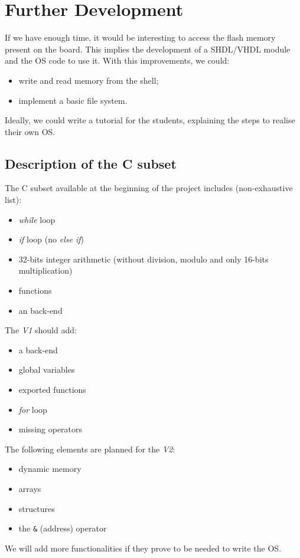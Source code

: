\documentclass{article}
\begin{document}
    \section{Further Development}
      If we have enough time, it would be interesting to access the flash memory
      present on the board. This implies the development of a SHDL/VHDL module
      and the OS code to use it. With this improvements, we could:
      \begin{itemize}
        \item write and read memory from the shell;
        \item implement a basic file system.
      \end{itemize}
      Ideally, we could write a tutorial for the students, explaining the steps
      to realise their own OS.

  \newpage

  \begin{appendix}
    \section{Description of the C subset}\label{app:C89}
      The C subset available at the beginning of the project includes
      (non-exhaustive list):
      \begin{itemize}
        \item \textit{while} loop
        \item \textit{if} loop (no \textit{else if})
        \item 32-bits integer arithmetic (without division, modulo and only
          16-bits multiplication)
        \item functions
        \item an  back-end
      \end{itemize}

      \noindent The \textit{V1} should add:
      \begin{itemize}
        \item a  back-end
        \item global variables
        \item exported functions
        \item \textit{for} loop
        \item missing operators
      \end{itemize}

      \noindent The following elements are planned for the \textit{V2}:
      \begin{itemize}
        \item dynamic memory
        \item arrays
        \item structures
        \item the \verb+&+ (address) operator
      \end{itemize}
      We will add more functionalities if they prove to be needed to write the
      OS. 
  \end{appendix}
\end{document}
